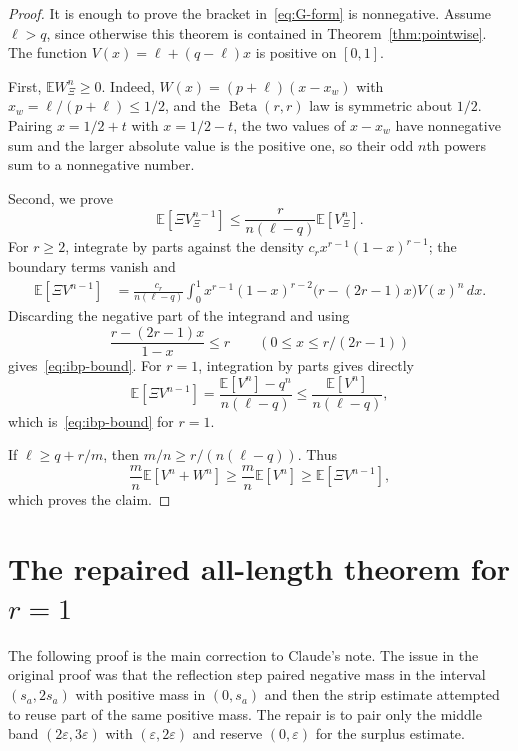 \documentclass[11pt]{article}
\newcommand{\E}{\mathbb E}
\newcommand{\Beta}{\operatorname{Beta}}
\begin{document}
\begin{proof}
It is enough to prove the bracket in~\eqref{eq:G-form} is nonnegative.  Assume $\ell>q$, since otherwise this theorem is contained in Theorem~\ref{thm:pointwise}.  The function $V(x)=\ell+(q-\ell)x$ is positive on $[0,1]$.

First, $\E W_\Xi^n\ge0$.  Indeed, $W(x)=(p+\ell)(x-x_w)$ with $x_w=\ell/(p+\ell)\le1/2$, and the $\Beta(r,r)$ law is symmetric about $1/2$.  Pairing $x=1/2+t$ with $x=1/2-t$, the two values of $x-x_w$ have nonnegative sum and the larger absolute value is the positive one, so their odd $n$th powers sum to a nonnegative number.

Second, we prove
\begin{equation}\label{eq:ibp-bound}
        \E[\Xi V_\Xi^{n-1}]
        \le \frac{r}{n(\ell-q)}\E[V_\Xi^n].
\end{equation}
For $r\ge2$, integrate by parts against the density $c_rx^{r-1}(1-x)^{r-1}$; the boundary terms vanish and
\[
\begin{aligned}
        \E[\Xi V^{n-1}]
        &=\frac{c_r}{n(\ell-q)}
        \int_0^1x^{r-1}(1-x)^{r-2}\bigl(r-(2r-1)x\bigr)V(x)^n\,dx.
\end{aligned}
\]
Discarding the negative part of the integrand and using
\[
        \frac{r-(2r-1)x}{1-x}\le r
        \qquad (0\le x\le r/(2r-1))
\]
gives~\eqref{eq:ibp-bound}.  For $r=1$, integration by parts gives directly
\[
        \E[\Xi V^{n-1}]=\frac{\E[V^n]-q^n}{n(\ell-q)}
        \le\frac{\E[V^n]}{n(\ell-q)},
\]
which is~\eqref{eq:ibp-bound} for $r=1$.

If $\ell\ge q+r/m$, then $m/n\ge r/(n(\ell-q))$.  Thus
\[
        \frac mn\E[V^n+W^n]
        \ge\frac mn\E[V^n]
        \ge\E[\Xi V^{n-1}],
\]
which proves the claim.
\end{proof}

\section{The repaired all-length theorem for $r=1$}\label{sec:r1}

The following proof is the main correction to Claude's note.  The issue in the original proof was that the reflection step paired negative mass in the interval $(s_a,2s_a)$ with positive mass in $(0,s_a)$ and then the strip estimate attempted to reuse part of the same positive mass.  The repair is to pair only the middle band $(2\varepsilon,3\varepsilon)$ with $(\varepsilon,2\varepsilon)$ and reserve $(0,\varepsilon)$ for the surplus estimate.
\end{document}
